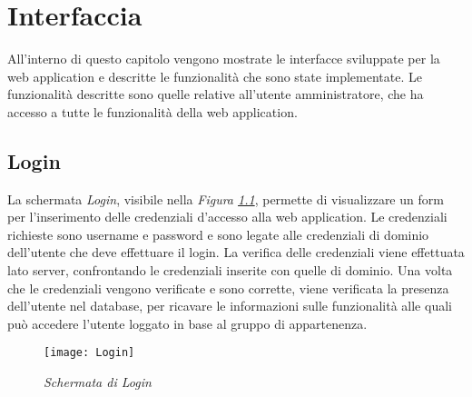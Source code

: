 \chapter{Interfaccia}
  \label{chapter_interfaccia}
  All'interno di questo capitolo vengono mostrate le interfacce sviluppate per la web application e descritte le funzionalità
  che sono state implementate. Le funzionalità descritte sono quelle relative all'utente amministratore, che ha accesso a tutte
  le funzionalità della web application.
  \section{Login}
  La schermata \textit{Login}, visibile nella \textit{Figura \ref{fig:Login}}, permette di visualizzare un form per
  l'inserimento delle credenziali d'accesso alla web application. Le credenziali richieste sono username e password e
  sono legate alle credenziali di dominio dell'utente che deve effettuare il login. La verifica delle credenziali viene
  effettuata lato server, confrontando le credenziali inserite con quelle di dominio. Una volta che le credenziali vengono
  verificate e sono corrette, viene verificata la presenza dell'utente nel database, per ricavare le informazioni sulle
  funzionalità alle quali può accedere l'utente loggato in base al gruppo di appartenenza.
  \begin{figure}[H]
    \texttt{[image: Login]}
    \centering
    \caption{\textit{Schermata di Login}}
    \label{fig:Login}
  \end{figure}

